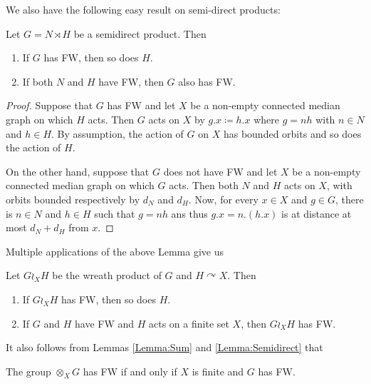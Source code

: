 We also have the following easy result on semi-direct products:
\begin{lem}\label{Lemma:Semidirect}
Let $G=N\rtimes H$ be a semidirect product. Then
\begin{enumerate}
\item
If $G$ has FW, then so does $H$.
\item
If both $N$ and $H$ have FW, then $G$ also has FW.
\end{enumerate}
\end{lem}
\begin{proof}
Suppose that $G$ has FW and let $X$ be a non-empty connected median graph on which $H$ acts.
Then $G$ acts on $X$ by $g.x\coloneqq h.x$ where $g=nh$ with $n\in N$ and $h\in H$.
By assumption, the action of $G$ on $X$ has bounded orbits and so does the action of $H$.

On the other hand, suppose that $G$ does not have FW and let $X$ be a non-empty connected median graph on which $G$ acts.
Then both $N$ and $H$ acts on $X$, with orbits bounded respectively by $d_N$ and $d_H$.
Now, for every $x\in X$ and $g\in G$, there is $n\in N$ and $h\in H$ such that $g=nh$ ans thus $g.x=n.(h.x)$ is at distance at most $d_N+d_H$ from $x$.
\end{proof}
Multiple applications of the above Lemma give us
\begin{cor}\label{Cor:Wreath}
Let $G\wr_X H$ be the wreath product of $G$ and $H\curvearrowright X$.
Then
\begin{enumerate}
\item
If $G\wr_X H$ has FW, then so does $H$.
\item
If $G$ and $H$ have FW and $H$ acts on a finite set $X$, then $G\wr_X H$ has FW.
\end{enumerate}
\end{cor}


It also follows from Lemmas \ref{Lemma:Sum} and \ref{Lemma:Semidirect} that
\begin{cor}
The group $\otimes_X G$ has FW if and only if $X$ is finite and $G$ has FW.
\end{cor}

